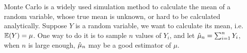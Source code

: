 \documentclass{iitthesis}
\begin{document}
\label{sec:generalerrorcriterion}
Monte Carlo is a widely used simulation method to calculate the mean of a random variable, whose true mean is unknown, or hard to be calculated analytically. Suppose $Y$ is a random variable, we want to calculate its mean, i.e. $\mathbb{E}(Y) = \mu$. One way to do it is to sample $n$ values of $Y_i$, and let $\hat{\mu}_n = \sum_{i=1}^n Y_i$, when $n$ is large enough, $\hat{\mu}_n$ may be a good estimator of $\mu$. 
%
\end{document}
